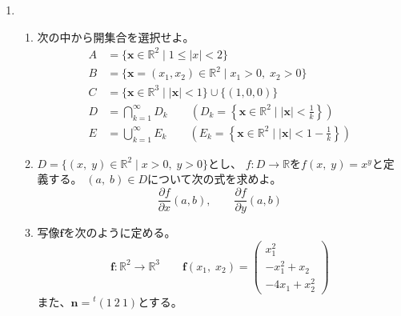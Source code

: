 \documentclass[12pt,b5paper]{ltjsarticle}
\begin{document}
\hrulefill

\begin{enumerate}
 \item 
       \begin{enumerate}
        \item
             次の中から開集合を選択せよ。
             \begin{align}
               A &= \{\bm{x}\in\mathbb{R}^2 \mid 1\leq \lvert x \rvert <2  \}\\
               B &= \{\bm{x}=(x_1, x_2)\in\mathbb{R}^2 \mid x_1>0, \; x_2>0 \}\\
               C &= \{\bm{x}\in\mathbb{R}^3 \mid \lvert \bm{x} \rvert<1 \} \cup \{(1,0,0)\}\\
               D &= \bigcap_{k=1}^{\infty} D_k \qquad \left(
                   D_k= \left\{\bm{x}\in\mathbb{R}^2 \mid
                   \lvert \bm{x} \rvert < \frac{1}{k} \right\}\right)\\
               E &= \bigcup_{k=1}^{\infty} E_k \qquad \left(
               E_k= \left\{\bm{x}\in\mathbb{R}^2 \mid
               \lvert \bm{x} \rvert < 1- \frac{1}{k} \right\}\right)
             \end{align}
        \item
             $D= \{(x,\;y)\in\mathbb{R}^2 \mid x>0,\; y>0\}$とし、
             $f: D\rightarrow\mathbb{R}$を$f(x,\;y)=x^y$と定義する。
             $(a,\;b)\in D$について次の式を求めよ。
             \begin{equation}
              \frac{\partial f}{\partial x}(a,b), \qquad \frac{\partial f}{\partial y}(a,b)
             \end{equation}
        \item
             写像$\bm{f}$を次のように定める。
             \begin{equation}
              \bm{f}:\mathbb{R}^2\rightarrow\mathbb{R}^3
               \qquad \bm{f}(x_1,\;x_2)
                 = \begin{pmatrix}x_1^2\\-x_1^2+x_2\\-4x_1+x_2^2\end{pmatrix}
             \end{equation}
             また、$\bm{n}={}^{t}\!(1\ 2\ 1)$とする。


\end{enumerate}
\end{enumerate}
\end{document}
